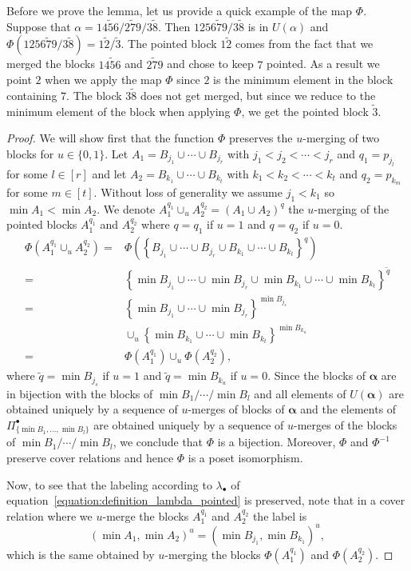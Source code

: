 \documentclass[11pt]{article}
\theoremstyle{definition}
\numberwithin{equation}{section}
\newcommand{\balpha}{\pmb{\alpha}}
\begin{document}
Before we prove the lemma, let us provide a quick example of the map $\Phi$. Suppose that $\alpha = 14\tilde{5}6/ 2\tilde{7}9/3\tilde{8}$.  Then $1256\tilde{7}9/ 3\tilde{8}$ is in $U(\alpha)$ and $\Phi(1256\tilde{7}9/ 3\tilde{8}) = 1\tilde{2}/\tilde{3}$.  The pointed block $1\tilde{2}$ comes from the fact that we merged the blocks $14\tilde{5}6$ and $ 2\tilde{7}9$ and chose to keep $7$ pointed. As a result we point $2$ when we apply the map $\Phi$ since $2$ is the minimum element in the block containing $7$.  The block $3\tilde{8}$ does not get merged, but since we reduce to the minimum element of the block when applying $\Phi$, we get the pointed block $\tilde{3}$.

\begin{proof}
We will show first that the function $\Phi$ preserves the $u$-merging of two blocks for $u\in \{0,1\}$. Let $A_1=B_{j_1}\cup\cdots \cup B_{j_r}$ with $j_1<j_2<\cdots <j_r$ and $q_1=p_{j_l}$ for some $l\in [r]$ and let $A_2=B_{k_1}\cup\cdots \cup B_{k_t}$ with $k_1<k_2<\cdots <k_t$ and $q_2=p_{k_m}$ for some $m\in [t]$. Without loss of generality we assume $j_1<k_1$ so $\min A_1 < \min A_2$. 
We denote $A_1^{q_1}\cup_{u} A_2^{q_2}=(A_1\cup A_2)^{q}$ the $u$-merging of the pointed blocks $A_1^{q_1}$ and $A_2^{q_2}$ where $q=q_1$ if $u=1$ and $q=q_2$ if $u=0$. 
\begin{align*}
     \Phi(A_1^{q_1}\cup_u A_2^{q_2})=&\Phi(\left\{ B_{j_1}\cup\cdots \cup  B_{j_r}\cup  B_{k_1}\cup\cdots \cup  B_{k_t}\right\}^{q})\\
     =&\left\{\min B_{j_1}\cup\cdots \cup \min B_{j_r}\cup \min B_{k_1}\cup\cdots \cup \min B_{k_t}\right\}^{\tilde q}\\
     =&\left\{\min B_{j_1}\cup\cdots \cup \min B_{j_r}\right\}^{\min B_{j_s}}\\
     &\cup_u \left\{\min B_{k_1}\cup\cdots \cup \min B_{k_t}\right\}^{\min B_{k_u}}\\
     =&\Phi(A_1^{q_1})\cup_u \Phi(A_2^{q_2}), 
 \end{align*}
 where $\tilde q=\min B_{j_s}$ if $u=1$ and $\tilde q=\min B_{k_u}$ if $u=0$. Since the blocks of $\balpha$ are in bijection with the blocks of $\min B_1/\cdots/\min B_l$ and all elements of $U(\balpha)$ are obtained uniquely by a sequence of $u$-merges of blocks of $\balpha$ and the elements of $\Pi_{\{\min B_1, \dots, \min B_l\}}^{\bullet}$ are obtained uniquely by a sequence of $u$-merges of the blocks of $\min B_1/\cdots/\min B_l$, we conclude that $\Phi$ is a bijection.  Moreover, $\Phi$ and $\Phi^{-1}$ preserve cover relations and hence $\Phi$ is a poset isomorphism.
 
 Now, to see that the labeling  according to $\lambda_{\bullet}$ of equation~\eqref{equation:definition_lambda_pointed} is preserved, note that in a cover relation where we $u$-merge the blocks $A_1^{q_1}$ and $A_2^{q_2}$ the label is
 $$(\min A_1, \min A_2)^u=(\min B_{j_1},\min B_{k_1})^u,$$
 which is the same obtained by $u$-merging the blocks $\Phi(A_1^{q_1})$ and $\Phi(A_2^{q_2})$.
\end{proof}
\end{document}
